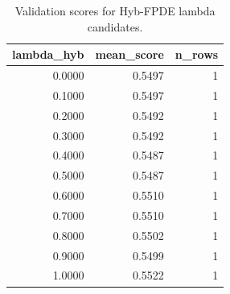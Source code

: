 \begin{table}[t]
\caption{Validation scores for Hyb-FPDE lambda candidates.}
\label{tab:lambda_distribution_computed}
\centering
\begin{tabular}{rrr}
\toprule
lambda\_hyb & mean\_score & n\_rows \\
\midrule
0.0000 & 0.5497 & 1 \\
0.1000 & 0.5497 & 1 \\
0.2000 & 0.5492 & 1 \\
0.3000 & 0.5492 & 1 \\
0.4000 & 0.5487 & 1 \\
0.5000 & 0.5487 & 1 \\
0.6000 & 0.5510 & 1 \\
0.7000 & 0.5510 & 1 \\
0.8000 & 0.5502 & 1 \\
0.9000 & 0.5499 & 1 \\
1.0000 & 0.5522 & 1 \\
\bottomrule
\end{tabular}

\end{table}
